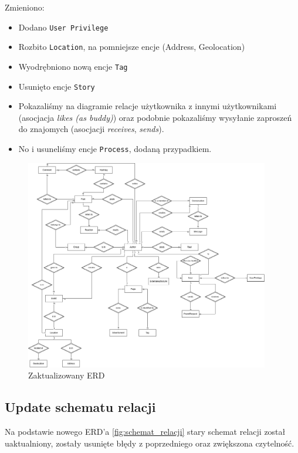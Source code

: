 \documentclass{article}
\begin{document}
Zmieniono: 

\begin{itemize}
  \item Dodano \texttt{User Privilege}
  \item Rozbito \texttt{Location}, na pomniejsze encje (Address, Geolocation)
  \item Wyodrębniono nową encje \texttt{Tag}
  \item Usunięto encje \texttt{Story}
  \item Pokazaliśmy na diagramie relacje użytkownika z innymi użytkownikami (asocjacja \textit{likes (as buddy)}) oraz podobnie pokazaliśmy wysyłanie zaproszeń do znajomych (asocjacji \textit{receives}, \textit{sends}).
  \item No i usuneliśmy encje \texttt{Process}, dodaną przypadkiem. 
\end{itemize}


\begin{figure}[htbp]
  \begin{center}
    \includegraphics[width=0.95\textwidth]{images/erd_8_1.png} 
  \end{center}
  \caption{Zaktualizowany ERD}
  \label{fig:new_erd}
\end{figure}


\subsection{Update schematu relacji}

Na podstawie nowego ERD'a \ref{fig:schemat_relacji} stary schemat relacji został uaktualniony, zostały usunięte błędy z poprzedniego oraz zwiększona czytelność. 
\end{document}
